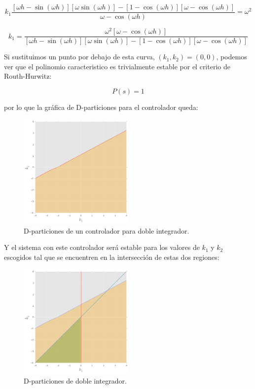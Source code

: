 \documentclass{article}
\begin{document}
\[
k_1 \frac{\left[ \omega h - \sin{(\omega h)} \right] \left[ \omega \sin{(\omega h)} \right] - \left[ 1 - \cos{(\omega h)} \right] \left[ \omega - \cos{(\omega h)} \right]}{\omega - \cos{(\omega h)}} = \omega^2
\]

\[
k_1 = \frac{\omega^2 \left[ \omega - \cos{(\omega h)} \right]}{\left[ \omega h - \sin{(\omega h)} \right] \left[ \omega \sin{(\omega h)} \right] - \left[ 1 - \cos{(\omega h)} \right] \left[ \omega - \cos{(\omega h)} \right]}
\]

Si sustituimos un punto por debajo de esta curva,
\((k_1, k_2) = (0, 0)\), podemos ver que el polinomio caracteristico es
trivialmente estable por el criterio de Routh-Hurwitz:

\[
P(s) = 1
\]

por lo que la gráfica de D-particiones para el controlador queda:

\begin{figure}[htbp]
\centering
\includegraphics[width=0.5\textwidth]{../imagenes/dobintcon.png}
\caption{D-particiones de un controlador para doble integrador.}
\end{figure}

Y el sistema con este controlador será estable para los valores de
\(k_1\) y \(k_2\) escogidos tal que se encuentren en la intersección de
estas dos regiones:

\begin{figure}[htbp]
\centering
\includegraphics[width=0.5\textwidth]{../imagenes/dobint.png}
\caption{D-particiones de doble integrador.}
\end{figure}
\end{document}
